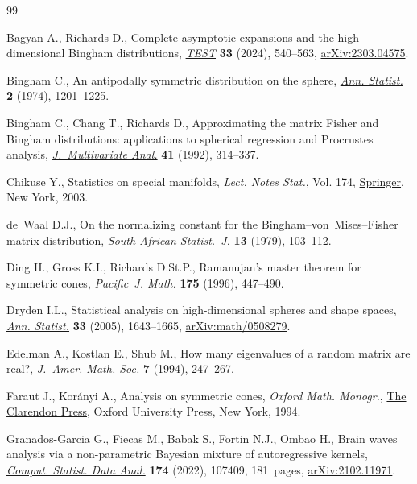 \documentclass[pdftex]{sigma}
\numberwithin{equation}{section}
\begin{document}
\begin{thebibliography}{99}
\footnotesize\itemsep=0pt

Bagyan A., Richards D., Complete asymptotic expansions and the high-dimensional
 {B}ingham distributions, \href{https://doi.org/10.1007/s11749-023-00910-w}{\textit{TEST}} \textbf{33} (2024), 540--563,
 \href{https://arxiv.org/abs/2303.04575}{arXiv:2303.04575}.

Bingham C., An antipodally symmetric distribution on the sphere, \href{https://doi.org/10.1214/aos/1176342874}{\textit{Ann.
 Statist.}} \textbf{2} (1974), 1201--1225.

Bingham C., Chang T., Richards D., Approximating the matrix {F}isher and
 {B}ingham distributions: applications to spherical regression and
 {P}rocrustes analysis, \href{https://doi.org/10.1016/0047-259X(92)90072-N}{\textit{J.~Multivariate Anal.}} \textbf{41} (1992),
 314--337.

Chikuse Y., Statistics on special manifolds, \textit{Lect. Notes Stat.}, Vol.
 174, \href{https://doi.org/10.1007/978-0-387-21540-2}{Springer}, New York, 2003.

de~Waal D.J., On the normalizing constant for the
 {B}ingham--von~{M}ises--{F}isher matrix distribution, \href{https://doi.org/10520/AJA0038271X_687}{\textit{South African
 Statist.~J.}} \textbf{13} (1979), 103--112.

Ding H., Gross K.I., Richards D.St.P., Ramanujan's master theorem for symmetric
 cones, \textit{Pacific~J. Math.} \textbf{175} (1996), 447--490.

Dryden I.L., Statistical analysis on high-dimensional spheres and shape spaces,
 \href{https://doi.org/10.1214/009053605000000264}{\textit{Ann. Statist.}} \textbf{33} (2005), 1643--1665, \href{https://arxiv.org/abs/math/0508279}{arXiv:math/0508279}.

Edelman A., Kostlan E., Shub M., How many eigenvalues of a random matrix are
 real?, \href{https://doi.org/10.2307/2152729}{\textit{J.~Amer. Math. Soc.}} \textbf{7} (1994), 247--267.

Faraut J., Kor\'anyi A., Analysis on symmetric cones, \textit{Oxford Math. Monogr.}, \href{https://doi.org/10.1093/oso/9780198534778.001.0001}{The
 Clarendon Press}, Oxford University Press, New York, 1994.

Granados-Garcia G., Fiecas M., Babak S., Fortin N.J., Ombao H., Brain waves
 analysis via a non-parametric {B}ayesian mixture of autoregressive kernels,
 \href{https://doi.org/10.1016/j.csda.2021.107409}{\textit{Comput. Statist. Data Anal.}} \textbf{174} (2022), 107409, 181~pages,
 \href{https://arxiv.org/abs/2102.11971}{arXiv:2102.11971}.


\end{thebibliography}
\end{document}
